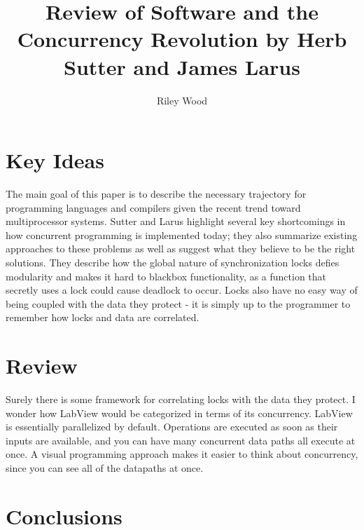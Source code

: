 \documentclass{article}
\title{Review of Software and the Concurrency Revolution by Herb Sutter and James Larus}
\author{Riley Wood}
\begin{document}
\maketitle

\section*{Key Ideas}
The main goal of this paper is to describe the necessary trajectory for programming languages and compilers given the recent trend toward multiprocessor systems. Sutter and Larus highlight several key shortcomings in how concurrent programming is implemented today; they also summarize existing approaches to these problems as well as suggest what they believe to be the right solutions. They describe how the global nature of synchronization locks defies modularity and makes it hard
to blackbox functionality, as a function that secretly uses a lock could cause deadlock to occur. Locks also have no easy way of being coupled with the data they protect - it is simply up to the programmer to remember how locks and data are correlated.

\section*{Review}
Surely there is some framework for correlating locks with the data they protect. I wonder how LabView would be categorized in terms of its concurrency. LabView is essentially parallelized by default. Operations are executed as soon as their inputs are available, and you can have many concurrent data paths all execute at once. A visual programming approach makes it easier to think about concurrency, since you can see all of the datapaths at once.

\section*{Conclusions}


\end{document}
